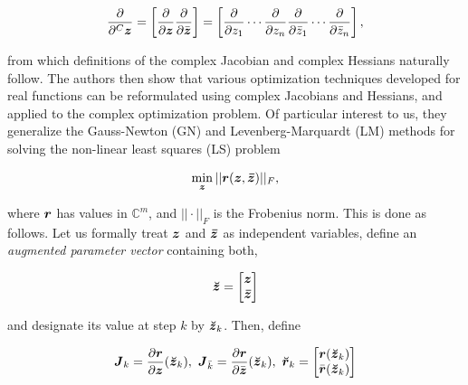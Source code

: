 \documentclass[useAMS,usenatbib]{mn2e}
\newcommand{\COMPLEX}{\mathbb{C}}
\newcommand{\zz}{\bmath{z}}
\newcommand{\zzc}{\bmath{\bar z}}
\newcommand{\rr}{\bmath{r}}
\newcommand{\mat}[1]{{\bmath{#1}}}
\newcommand{\JJ}{\mat{J}} %
\begin{document}
\[
\frac{\partial}{\partial^C \zz} = \left [ \frac{\partial}{\partial \zz} \frac{\partial}{\partial \bar{\zz}} \right ] = \left [ \frac{\partial}{\partial z_1} \cdots \frac{\partial}{\partial z_n}
\frac{\partial}{\partial \bar{z}_1} \cdots \frac{\partial}{\partial \bar{z}_n} \right ],
\]

from which definitions of the complex Jacobian and complex Hessians naturally follow. The authors then show 
that various optimization techniques developed for real functions can be reformulated using 
complex Jacobians and Hessians, and applied to the complex optimization problem. Of particular interest to 
us, they generalize the Gauss-Newton (GN) and Levenberg-Marquardt (LM) methods for solving the non-linear 
least squares (LS) problem

\newcommand{\Matrix}[2]{\left [ \begin{array}{@{}#1@{}}#2\end{array} \right ]}
\newcommand{\Stack}[1]{\begin{array}{@{}c@{}}#1\end{array}}

\newcommand{\AUG}[1]{\bmath{\breve{#1}}}

\newcommand{\Zz}{\AUG{z}}
\newcommand{\Gg}{\AUG{g}}
\newcommand{\Rr}{\AUG{r}}
\newcommand{\Dd}{\AUG{d}}
\newcommand{\Vv}{\AUG{v}}
\newcommand{\GGg}{\AUG{G}}
\newcommand{\RRr}{\AUG{R}}
\newcommand{\DDd}{\AUG{D}}
\newcommand{\VVv}{\AUG{V}}


\begin{equation}
\label{eq:LSmin}
\min_{\bmath{z}} ||\bmath{r}(\zz,\zzc)||_F,
\end{equation}

where $\bmath{r}$ has values in $\COMPLEX^m$, and $||\cdot||_F$ is the Frobenius norm. This is done as follows.
Let us formally treat $\zz$ and $\zzc$ as independent variables, define an {\em augmented parameter vector} containing both, 



\[
\Zz = \Matrix{c}{\zz \\ \zzc}
\]


and designate its value at step $k$ by $\Zz_k$. Then, define


\begin{equation}
\label{eq:Jkrk}
\JJ_k=\frac{\partial \rr}{\partial \zz} (\Zz_k), ~\JJ_{\bar{k}}=\frac{\partial \rr}{\partial \bar{\zz}}(\Zz_k),~
\Rr_k=\Matrix{c}{\rr(\Zz_k)\\\bar{\rr}(\Zz_k)}
\end{equation}
\end{document}
